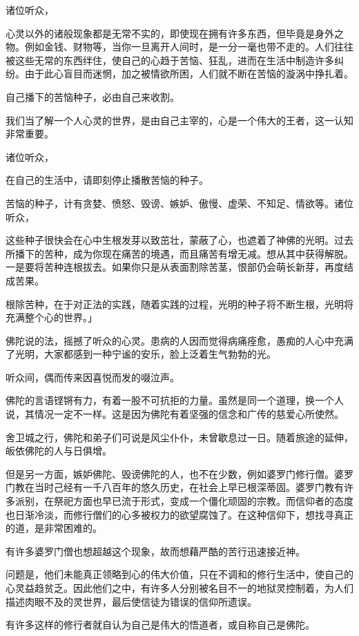 \documentclass[twoside,openany]{book}
\begin{document}
诸位听众，

心灵以外的诸般现象都是无常不实的，即使现在拥有许多东西，但毕竟是身外之物。例如金钱、财物等，当你一旦离开人间时，是一分一毫也带不走的。人们往往被这些无常的东西绊住，使自己的心趋于苦恼、狂乱，进而在生活中制造许多纠纷。由于此心盲目而迷惘，加之被情欲所困，人们就不断在苦恼的漩涡中挣扎着。

自己播下的苦恼种子，必由自己来收割。

我们当了解一个人心灵的世界，是由自己主宰的，心是一个伟大的王者，这一认知非常重要。

诸位听众，

在自己的生活中，请即刻停止播散苦恼的种子。

苦恼的种子，计有贪婪、愤怒、毁谤、嫉妒、傲慢、虚荣、不知足、情欲等。诸位听众，

这些种子很快会在心中生根发芽以致茁壮，蒙蔽了心，也遮着了神佛的光明。过去所播下的苦种，成为你现在痛苦的境遇，而且痛苦有增无减。想从其中获得解脱。一是要将苦种连根拔去。如果你只是从表面割除苦茎，恨部仍会萌长新芽，再度结成苦果。

根除苦种，在于对正法的实践，随着实践的过程，光明的种子将不断生根，光明将充满整个心的世界。」

佛陀说的法，摇撼了听众的心灵。患病的人因而觉得病痛痊愈，愚痴的人心中充满了光明，大家都感到一种宁谧的安乐，脸上泛着生气勃勃的光。

听众间，偶而传来因喜悦而发的啜泣声。

佛陀的言语铿锵有力，有着一股不可抗拒的力量。虽然是同一个道理，换一个人说，其情况一定不一样。这是因为佛陀有着坚强的信念和广传的慈爱心所使然。

舍卫城之行，佛陀和弟子们可说是风尘仆仆，未曾歇息过一日。随着旅途的延伸，皈依佛陀的人与日俱增。

但是另一方面，嫉妒佛陀、毁谤佛陀的人，也不在少数，例如婆罗门修行僧。婆罗门教在当时己经有一千八百年的悠久历史，在社会上早已根深蒂固。婆罗门教有许多派别，在祭祀方面也早已流于形式，变成一个僵化顽固的宗教。而信仰者的态度也日渐冷淡，而修行僧们的心多被权力的欲望腐蚀了。在这种信仰下，想找寻真正的道，是非常困难的。

有许多婆罗门僧也想超越这个现象，故而想藉严酷的苦行迅速接近神。

问题是，他们未能真正领略到心的伟大价值，只在不调和的修行生活中，使自己的心灵益趋贫乏。因此他们之中，有许多人分别被名目不一的地狱灵控制着，为人们描述肉眼不及的灵世界，最后使信徒为错误的信仰所遗误。

有许多这样的修行者就自认为自己是伟大的悟道者，或自称自己是佛陀。
\end{document}
